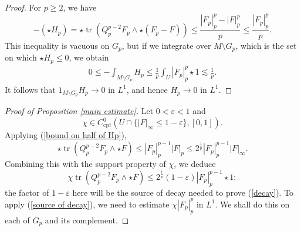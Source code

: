 \documentclass[reqno,11pt]{amsart}
\DeclareMathOperator{\tr}{tr}
\newcommand{\cpt}{\mathrm{cpt}}
\theoremstyle{definition}
\numberwithin{equation}{section}
\begin{document}
\begin{proof}
For $p \geq 2$, we have \cite[Proposition 2.3]{daskalopoulos2022analytic}
$$-(\star H_p) = \star \tr(Q_p^{p - 2} F_p \wedge \star (F_p - F)) \leq \frac{|F_p|_p^p - |F|_p^p}{p} \leq \frac{|F_p|_p^p}{p}.$$
This inequality is vacuous on $G_p$, but if we integrate over $M \setminus G_p$, which is the set on which $\star H_p \leq 0$, we obtain
\begin{align*}
0 \leq -\int_{M \setminus G_p} H_p \leq \frac{1}{p} \int_U |F_p|_p^p \star 1 \lesssim \frac{1}{p}.
\end{align*}
It follows that $1_{M \setminus G_p} H_p \to 0$ in $L^1$, and hence $H_p \to 0$ in $L^1$.
\end{proof}

\begin{proof}[Proof of Proposition \ref{main estimate}]
Let $0 < \varepsilon < 1$ and
$$\chi \in C^0_\cpt(U \cap \{|F|_\infty \leq 1 - \varepsilon\}, [0, 1]).$$
Applying (\ref{bound on half of Hp}),
$$\star \tr(Q_p^{p - 2} F_p \wedge \star F) \leq |F_p|_p^{p - 1} |F|_p \leq 2^{\frac{1}{p}} |F_p|_p^{p - 1} |F|_\infty.$$
Combining this with the support property of $\chi$, we deduce
\begin{equation}\label{source of decay}
\chi \tr(Q_p^{p - 2} F_p \wedge \star F) \leq 2^{\frac{1}{p}} (1 - \varepsilon) |F_p|_p^{p - 1} \star 1;
\end{equation}
the factor of $1 - \varepsilon$ here will be the source of decay needed to prove (\ref{decay}).
To apply (\ref{source of decay}), we need to estimate $\chi |F_p|_p^p$ in $L^1$.
We shall do this on each of $G_p$ and its complement.


\end{proof}
\end{document}

